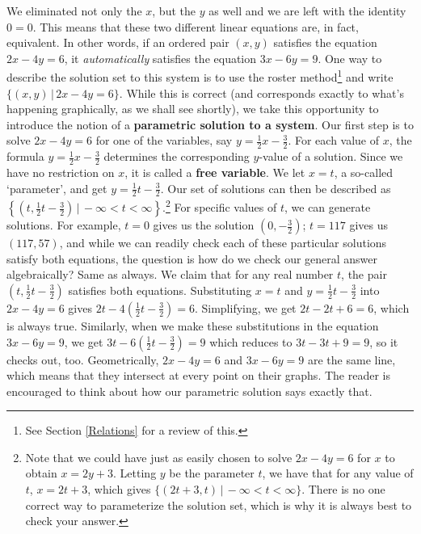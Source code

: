 \begin{ex}
\begin{enumerate}
We eliminated not only the $x$, but the $y$ as well and we are left with the identity $0=0$.  This means that these two different linear equations are, in fact, equivalent.  In other words, if an ordered pair $(x,y)$ satisfies the equation $2x-4y = 6$, it \textit{automatically} satisfies the equation $3x-6y = 9$.  One way to describe the solution set to this system is to use the roster method\footnote{See Section \ref{Relations} for a review of this.} and write $\{(x,y) \, | \, 2x-4y = 6\}$.  While this is correct (and corresponds exactly to what's happening graphically, as we shall see shortly), we take this opportunity to introduce the notion of a  \textbf{parametric solution to a system}.  Our first step is to solve $2x-4y = 6$ for one of the variables, say $y = \frac{1}{2} x - \frac{3}{2}$.  For each value of $x$, the formula $y = \frac{1}{2} x - \frac{3}{2}$ determines the corresponding $y$-value of a solution.  Since we have no restriction on $x$, it is called a   \textbf{free variable}.  We let $x=t$, a so-called `parameter', and get $y = \frac{1}{2} t - \frac{3}{2}$. Our set of solutions can then be described as $\left\{ \left(t, \frac{1}{2} t - \frac{3}{2}\right) \, | \, -\infty < t < \infty \right\}$.\footnote{Note that we could have just as easily chosen to solve $2x-4y = 6$ for $x$ to obtain $x = 2y + 3$.  Letting $y$ be the parameter $t$, we have that for any value of $t$, $x = 2t+3$, which gives $\{(2t+3, t) \, | \, - \infty < t < \infty\}$.  There is no one correct way to parameterize the solution set, which is why it is always best to check your answer.}  For specific values of $t$, we can generate solutions.  For example, $t=0$ gives us the solution $\left(0,-\frac{3}{2}\right)$;  $t = 117$ gives us $(117,57)$, and while we can readily check  each of these particular solutions satisfy both equations, the question is how do we check our general answer algebraically?  Same as always.  We claim that for any real number $t$, the pair $\left(t, \frac{1}{2} t - \frac{3}{2}\right)$ satisfies both equations.  Substituting $x = t$ and $y =  \frac{1}{2} t - \frac{3}{2}$ into $2x - 4y = 6$ gives $2t - 4\left(\frac{1}{2} t - \frac{3}{2}\right) = 6$.  Simplifying, we get $2t - 2t + 6 = 6$, which is always true.  Similarly, when we make these substitutions in the equation $3x-6y = 9$, we get $3t - 6\left(\frac{1}{2} t - \frac{3}{2}\right) = 9$ which reduces to $3t - 3t + 9 = 9$, so it checks out, too.  Geometrically, $2x-4y = 6$ and $3x-6y=9$ are the same line, which means that they intersect at every point on their graphs.  The reader is encouraged to think about how our parametric solution says exactly that.


\end{enumerate}
\end{ex}
